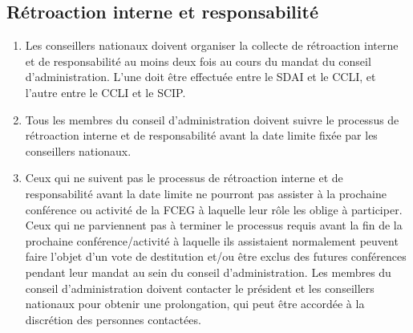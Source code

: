 \subsection{Rétroaction interne et responsabilité}
\label{retroaction-interne-et-responsabilite}

\begin{enumerate}
 \item
  Les conseillers nationaux doivent organiser la collecte de rétroaction interne et de responsabilité au moins deux fois au cours du mandat du conseil d'administration. L'une doit être effectuée entre le SDAI et le CCLI, et l'autre entre le CCLI et le SCIP.
 \item
  Tous les membres du conseil d'administration doivent suivre le processus de rétroaction interne et de responsabilité avant la date limite fixée par les conseillers nationaux.
 \item
  Ceux qui ne suivent pas le processus de rétroaction interne et de responsabilité avant la date limite ne pourront pas assister à la prochaine conférence ou activité de la FCEG à laquelle leur rôle les oblige à participer. Ceux qui ne parviennent pas à terminer le processus requis avant la fin de la prochaine conférence/activité à laquelle ils assistaient normalement peuvent faire l'objet d'un vote de destitution et/ou être exclus des futures conférences pendant leur mandat au sein du conseil d'administration. Les membres du conseil d'administration doivent contacter le président et les conseillers nationaux pour obtenir une prolongation, qui peut être accordée à la discrétion des personnes contactées.
\end{enumerate}
